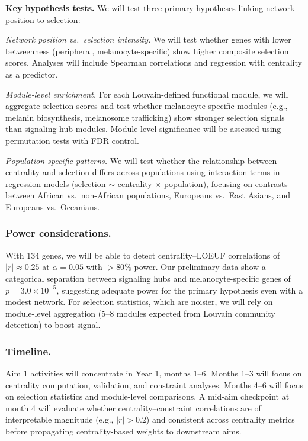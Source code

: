 \documentclass[11pt]{article}
\begin{document}
\textbf{Key hypothesis tests.} We will test three primary hypotheses linking network position to selection:

\emph{Network position vs.\ selection intensity.} We will test whether genes with lower betweenness (peripheral, melanocyte-specific) show higher composite selection scores. Analyses will include Spearman correlations and regression with centrality as a predictor.

\emph{Module-level enrichment.} For each Louvain-defined functional module, we will aggregate selection scores and test whether melanocyte-specific modules (e.g., melanin biosynthesis, melanosome trafficking) show stronger selection signals than signaling-hub modules. Module-level significance will be assessed using permutation tests with FDR control.

\emph{Population-specific patterns.} We will test whether the relationship between centrality and selection differs across populations using interaction terms in regression models (selection $\sim$ centrality $\times$ population), focusing on contrasts between African vs.\ non-African populations, Europeans vs.\ East Asians, and Europeans vs.\ Oceanians.

\subsubsection{Power considerations.}
With 134 genes, we will be able to detect centrality--LOEUF correlations of $|r| \approx 0.25$ at $\alpha = 0.05$ with $> 80\%$ power. Our preliminary data show a categorical separation between signaling hubs and melanocyte-specific genes of $p = 3.0 \times 10^{-5}$, suggesting adequate power for the primary hypothesis even with a modest network. For selection statistics, which are noisier, we will rely on module-level aggregation (5--8 modules expected from Louvain community detection) to boost signal.

\subsubsection{Timeline.}
Aim 1 activities will concentrate in Year 1, months 1--6. Months 1--3 will focus on centrality computation, validation, and constraint analyses. Months 4--6 will focus on selection statistics and module-level comparisons. A mid-aim checkpoint at month 4 will evaluate whether centrality--constraint correlations are of interpretable magnitude (e.g., $|r| > 0.2$) and consistent across centrality metrics before propagating centrality-based weights to downstream aims.
\end{document}
